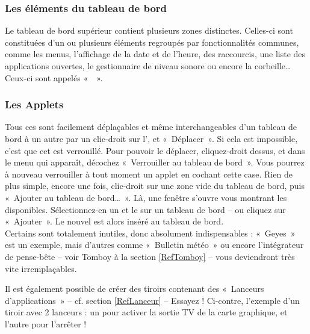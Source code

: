 \subsubsection{Les éléments du tableau de bord}
Le tableau de bord supérieur contient plusieurs zones distinctes. Celles-ci sont constituées d'un ou plusieurs éléments regroupés par fonctionnalités communes, comme les menus, l'affichage de la date et de l'heure, des raccourcis, une liste des applications ouvertes, le gestionnaire de niveau sonore ou encore la corbeille\ldots{} Ceux-ci sont appelés «~~».
\subsubsection{Les Applets}
\label{RefApplet}
Tous ces  sont facilement déplaçables et même interchangeables d'un tableau de bord à un autre par un clic-droit sur l', et «~Déplacer~». Si cela est impossible, c'est que cet  est verrouillé. Pour pouvoir le déplacer, cliquez-droit dessus, et dans le menu qui apparaît, décochez «~Verrouiller au tableau de bord~». Vous pourrez à nouveau verrouiller à tout moment un applet en cochant cette case.
Rien de plus simple, encore une fois, clic-droit sur une zone vide du tableau de bord, puis «~Ajouter au tableau de bord\ldots{}~». Là, une fenêtre s'ouvre vous montrant les  disponibles. Sélectionnez-en un et  le sur un tableau de bord -- ou cliquez sur «~Ajouter~». Le nouvel  est alors inséré au tableau de bord.\\
Certains sont totalement inutiles, donc absolument indispensables : «~Geyes~» est un exemple, mais d'autres comme «~Bulletin météo~» ou encore l'intégrateur de pense-bête -- voir Tomboy à la section \ref{RefTomboy} -- vous deviendront très vite irremplaçables.\par
{}
Il est également possible de créer des tiroirs contenant des «~Lanceurs d'applications~» -- cf. section \ref{RefLanceur} --  Essayez ! Ci-contre, l'exemple d'un tiroir avec 2 lanceurs : un pour activer la sortie TV de la carte graphique, et l'autre pour l'arrêter !\\\\\\
